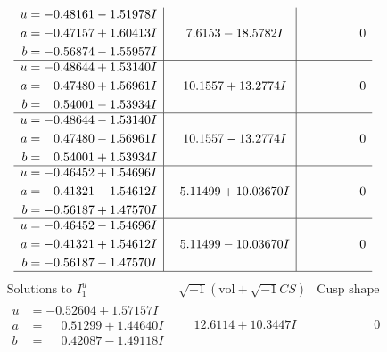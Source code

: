 \documentclass[1p]{elsarticle_modified}
\theoremstyle{definition}
\newcommand{\I}{\sqrt{-1}}
\begin{document}
$$\begin{array}{c|c|c}
\begin{aligned}
u &= -0.48161 - 1.51978 I \\
a &= -0.47157 + 1.60413 I \\
b &= -0.56874 - 1.55957 I\end{aligned}
 & \phantom{-}7.6153 - 18.5782 I & \phantom{-0.000000 } 0 \\ \hline\begin{aligned}
u &= -0.48644 + 1.53140 I \\
a &= \phantom{-}0.47480 + 1.56961 I \\
b &= \phantom{-}0.54001 - 1.53934 I\end{aligned}
 & \phantom{-}10.1557 + 13.2774 I & \phantom{-0.000000 } 0 \\ \hline\begin{aligned}
u &= -0.48644 - 1.53140 I \\
a &= \phantom{-}0.47480 - 1.56961 I \\
b &= \phantom{-}0.54001 + 1.53934 I\end{aligned}
 & \phantom{-}10.1557 - 13.2774 I & \phantom{-0.000000 } 0 \\ \hline\begin{aligned}
u &= -0.46452 + 1.54696 I \\
a &= -0.41321 - 1.54612 I \\
b &= -0.56187 + 1.47570 I\end{aligned}
 & \phantom{-}5.11499 + 10.03670 I & \phantom{-0.000000 } 0 \\ \hline\begin{aligned}
u &= -0.46452 - 1.54696 I \\
a &= -0.41321 + 1.54612 I \\
b &= -0.56187 - 1.47570 I\end{aligned}
 & \phantom{-}5.11499 - 10.03670 I & \phantom{-0.000000 } 0\\
 \hline 
 \end{array}$$\newpage$$\begin{array}{c|c|c}  
\text{Solutions to }I^u_{1}& \I (\text{vol} + \sqrt{-1}CS) & \text{Cusp shape}\\
 \hline 
\begin{aligned}
u &= -0.52604 + 1.57157 I \\
a &= \phantom{-}0.51299 + 1.44640 I \\
b &= \phantom{-}0.42087 - 1.49118 I\end{aligned}
 & \phantom{-}12.6114 + 10.3447 I & \phantom{-0.000000 } 0 \\ \hline\begin{aligned}

\end{aligned}
\end{array}$$
\end{document}
